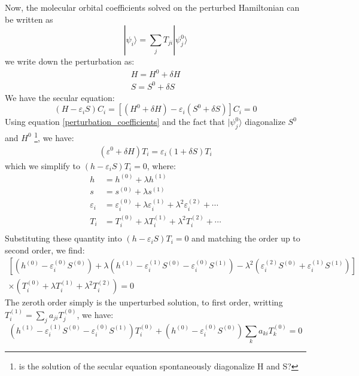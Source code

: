 \documentclass{article}
\newcommand{\order}[2]{#1^{(#2)}}
\newcommand{\stateket}[1]{| #1 \rangle}
\begin{document}
Now, the molecular orbital coefficients solved on the perturbed Hamiltonian can be written as 
\begin{equation}
    \label{perturbation_coefficients}
    \stateket{\psi_i} = \sum_j T_{ji} \stateket{\psi^0_j}
\end{equation}
we write down the perturbation as:
\begin{align}
    H = H^0 + \delta H \\
    S = S^0 + \delta S
\end{align}
We have the secular equation:
\begin{equation}
    (H - \varepsilon_i S) C_i = \left[ (H^0 + \delta H) - \varepsilon_i (S^0 + \delta S) \right] C_i = 0
\end{equation}
Using equation \eqref{perturbation_coefficients} and the fact that $\stateket{\psi^0_j}$ diagonalize $S^0$ and $H^0$
\footnote{is the solution of the secular equation spontaneously diagonalize H and S?},
we have:
\begin{align}
    (\varepsilon^0 + \delta H) T_i = \varepsilon_i (1 + \delta S) T_i
\end{align} 
which we simplify to $(h - \varepsilon_i S) T_i = 0$, where:
\begin{align}
    h &= \order{h}{0} + \lambda \order{h}{1} \\ 
    s &= \order{s}{0} + \lambda \order{s}{1} \\ 
    \varepsilon_i &= \order{\varepsilon_i}{0} + \lambda \order{\varepsilon_i}{1} + \lambda^2 \order{\varepsilon_i}{2} + \cdots \\
    T_i &= \order{T_i}{0} + \lambda \order{T_i}{1} + \lambda^2 \order{T_i}{2} + \cdots \\ 
\end{align}
Substituting these quantity into $(h - \varepsilon_i S) T_i = 0$ and matching the order up to second order, we find:
\begin{align}
    \left[(\order{h}{0} - \order{\varepsilon_i}{0}\order{S}{0}) + \lambda (\order{h}{1} - \order{\varepsilon_i}{1} \order{S}{0} - \order{\varepsilon_i}{0} \order{S}{1}) - \lambda^2 (\order{\varepsilon_i}{2} \order{S}{0} + \order{\varepsilon_i}{1} \order{S}{1})\right] \\ 
    \times \left( \order{T_i}{0} + \lambda \order{T_i}{1} + \lambda^2 \order{T_i}{2} \right) = 0
\end{align}
The zeroth order simply is the unperturbed solution, to first order, writting $\order{T_i}{1} = \sum_{j} a_{ji} \order{T_j}{0}$, we have:
\begin{equation}
    \label{E:mop_firstorder}
    (\order{h}{1} - \order{\varepsilon_i}{1} \order{S}{0} - \order{\varepsilon_i}{0} \order{S}{1}) \order{T_i}{0} + (\order{h}{0} - \order{\varepsilon_i}{0}\order{S}{0}) \sum_{k} a_{ki} \order{T_k}{0} = 0
\end{equation}
\end{document}
